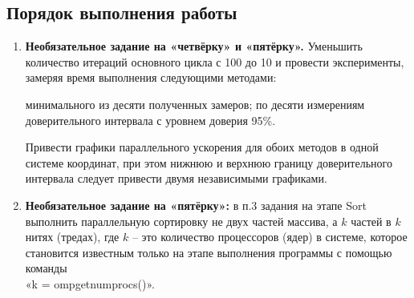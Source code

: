 { %
	\subsection{Порядок выполнения работы}
	\begin{enumerate}
		 программе, полученной в результате выполнения ЛР-3, так изменить этап Generate, чтобы генерируемый набор случайных чисел не зависел от количества потоков, выполняющих программу. Например, на каждой итерации $i$ перед вызовом rand\textunderscore r можно вызывать функцию srand(f(i)), где f – произвольно выбранная функция. Можно придумать и использовать любой другой способ.
		 вызовы функции gettimeofday на omp\textunderscore get\textunderscore wtime.
		 вычисления на этапе Sort, для чего выполнить сортировку в два этапа: 
			\begin{itemize}
				 первую и вторую половину массива в двух независимых нитях (можно использовать OpenMP-директиву ''parallel sections''); 
				 отсортированные половины в единый массив.
			\end{itemize}
		 функцию, которая один раз в секунду выводит в консоль сообщение о текущем проценте завершения работы программы. Указанную функцию необходимо запустить в отдельном потоке, параллельно работающем с основным вычислительным циклом.
		 прямую совместимость (forward compatibility) написанной параллельной программы. Для этого все вызываемые функции вида «omp\textunderscore *» можно условно переопределить в препроцессорных директивах, например, так:
			\begin{figure}[H]
				
			\end{figure}
		 эксперименты, варьируя $N$ от $min(\frac{N_x}{2},\;N_1)$ до $N_2$, где значения $N_1$ и $N_2$ взять из ЛР-1, а $N_x$ – это такое значение $N$, при котором накладные расходы на распараллеливание превышают выигрыш от распараллеливания. Написать отчёт о проделанной работе. Подготовиться к устным вопросам на защите.
		\item\textbf{Необязательное задание на «четвёрку» и «пятёрку».} Уменьшить количество итераций основного цикла с 100 до 10 и провести эксперименты, замеряя время выполнения следующими методами: 
			\begin{itemize}
				 минимального из десяти полученных замеров; 
				 по десяти измерениям доверительного интервала с уровнем доверия 95\%.
			\end{itemize}
			Привести графики параллельного ускорения для обоих методов в одной системе координат, при этом нижнюю и верхнюю границу доверительного интервала следует привести двумя независимыми графиками.
		\item\textbf{Необязательное задание на «пятёрку»:} в п.3 задания на этапе Sort выполнить параллельную сортировку не двух частей массива, а $k$ частей в $k$ нитях (тредах), где $k$ – это количество процессоров (ядер) в системе, которое становится известным только на этапе выполнения программы с помощью команды \\«k = omp\textunderscore get\textunderscore num\textunderscore procs()».
	\end{enumerate}
}